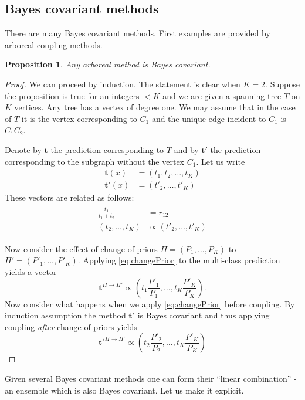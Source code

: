 \documentclass[twoside,11pt]{article}
\newtheorem{prop}{Proposition}
\begin{document}
\subsection{Bayes covariant methods}

There are many Bayes covariant methods. First examples are provided by arboreal coupling methods. 

\begin{prop}
Any arboreal method is Bayes covariant.
\end{prop}
\begin{proof}
	We can proceed by induction. The statement is clear when $K=2$. Suppose the proposition is true for an integers $<K$ and we are given a spanning tree $T$ on $K$ vertices. Any tree has a vertex of degree one. We may assume that in the case of $T$ it is the vertex corresponding to $C_1$ and the unique edge incident to $C_1$ is $C_1C_2$.
	
	 Denote by $\boldsymbol{t}$ the prediction corresponding to $T$ and by $\boldsymbol{t}'$ the prediction corresponding to the subgraph without the vertex $C_1$. Let us write 
	\begin{align*}
	\boldsymbol{t}(x) &= (t_1, t_2, \ldots, t_K) \\
	\boldsymbol{t'}(x) &= ( t'_2, \ldots, t'_K) 
\end{align*}
These vectors are related as follows:
\begin{align}
\begin{split}
\frac{t_1}{t_1+t_2} &= r_{12} \\
(t_2, \ldots, t_K) &\propto (t'_2, \ldots, t'_{K})
\end{split} \label{eq:ind1}
\end{align}

Now consider the effect of change of priors $\Pi = (P_1, \ldots, P_K)$ to $\Pi' = (P'_1, \ldots, P'_K)$. Applying \eqref{eq:changePrior} to the multi-class prediction yields a vector 
$$
\boldsymbol{t}^{\Pi\rightarrow \Pi'} \propto (t_1 \frac{P'_1}{P_1}, \ldots, t_K \frac{P'_K}{P_K}).
$$
Now consider what happens when we apply \eqref{eq:changePrior} before coupling. By induction assumption the method $\boldsymbol{t}'$ is Bayes covariant and thus applying coupling \emph{after} change of priors yields
$$
\boldsymbol{t}'^{\Pi\rightarrow \Pi'} \propto (t_2 \frac{P'_2}{P_2}, \ldots, t_K \frac{P'_K}{P_K})
$$

\end{proof}

Given several Bayes covariant methods one can form  their ``linear combination'' - an ensemble which is also Bayes covariant. Let us make it explicit.
\end{document}
